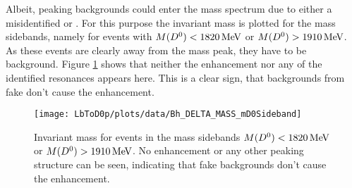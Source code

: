 Albeit, peaking backgrounds could enter the \Dz\proton mass spectrum due to either a misidentified \Dz or \proton.
For this purpose the invariant \Dz\proton mass is plotted for the \Dz mass sidebands, namely for events with $M({{D}^0}) < 1820 \mathrm{\,Me\kern -0.1em V}$ or $M({{D}^0}) > 1910 \mathrm{\,Me\kern -0.1em V}$.
As these events are clearly away from the \Dz mass peak, they have to be background.
Figure \ref{fig:plot_mD0p_mD0Sideband} shows that neither the enhancement nor any of the identified \Lc resonances appears here.
This is a clear sign, that backgrounds from fake \Dz don't cause the enhancement.
\begin{figure}[ptb]
	\centering
	\texttt{[image: LbToD0p/plots/data/Bh\_DELTA\_MASS\_mD0Sideband]}
	\caption{Invariant \Dz\proton mass for events in the \Dz mass sidebands $M({{D}^0}) < 1820 \mathrm{\,Me\kern -0.1em V}$ or $M({{D}^0}) > 1910 \mathrm{\,Me\kern -0.1em V}$. No enhancement or any other peaking structure can be seen, indicating that fake \Dz backgrounds don't cause the enhancement.}
	\label{fig:plot_mD0p_mD0Sideband}
\end{figure}

